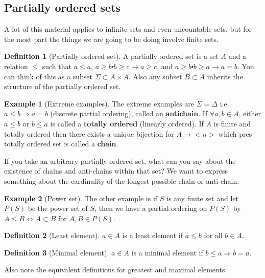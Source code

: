 \documentclass[12pt]{article}
\theoremstyle{definition}
\newtheorem{defn}{Definition}
\newtheorem{exmp}{Example}[section]
\begin{document}
\subsection{Partially ordered sets}

A lot of this material applies to infinite sets and even uncountable sets, but
for the most part the things we are going to be doing involve finite sets.

\begin{defn}[Partially ordered set]
    A partially ordered set is a set $A$ and a relation $\le$ such that $a \le
    a$, $a \ge b \centerdot b \ge c \rightarrow a \ge c$, and $a \ge b
    \centerdot b \ge a \rightarrow a = b$. You can think of this as a subset
    $\Sigma \subset A \times A$. Also any subset $B \subset A$ inherits the
    structure of the partially ordered set.
\end{defn}

\begin{exmp}[Extreme examples]
The extreme examples are $\Sigma = \Delta$ i.e. $a \le b \Rightarrow a = b$
(discrete partial ordering), called an \textbf{antichain}.  If $\forall a, b
\in A$, either $a \le b$ or $b \le a $ is called a \textbf{totally ordered}
(linearly ordered). If $A$ is finite and totally ordered then there exists a
unique bijection for $A \rightarrow <n>$ which pres
totally ordered set is called a \textbf{chain}.
\end{exmp}

If you take an arbitrary partially ordered set, what can you say about the
existence of chains and anti-chains within that set? We want to express
something about the cardinality of the  longest possible chain or anti-chain.

\begin{exmp}[Power set]
The other example is if $S$ is any finite set and let $P(S)$ be the power set
of $S$, then we have a partial ordering on $P(S)$ by $A \le B \Leftrightarrow A
\subset B$ for $A, B \in P(S)$.
\end{exmp}

\begin{defn}[Least element]
    $a \in A$ is a least element if $a \le b$ for all $b \in A$.
\end{defn}

\begin{defn}[Minimal element]
    $a \in A$ is a minimal element if $b \le a \Rightarrow b = a$.
\end{defn}

Also note the equivalent definitions for greatest and maximal elements. 
\end{document}
